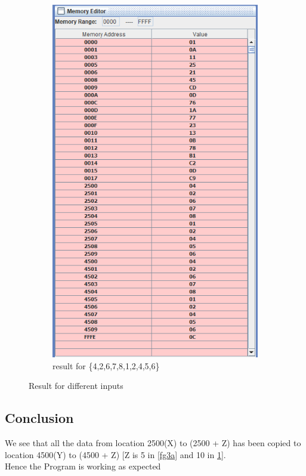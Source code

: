 \documentclass[a4paper]{article} %
\begin{document}
\begin{figure}[h!]
    \begin{subfigure}[b]{0.49\linewidth}
        \centering
        \includegraphics[width=\linewidth]{Assignment 2/1_Move Blocks/10 data copy.png}
        \caption{result for \{4,2,6,7,8,1,2,4,5,6\}}
        \label{fg3b}
    \end{subfigure}
    \caption{Result for different inputs}
    \label{fg3}
\end{figure}
\subsection{Conclusion}
We see that all the data from location 2500(X) to (2500 + Z) has been copied to location 4500(Y) to (4500 + Z) [Z is 5 in \ref{fg3a} and 10 in \ref{fg3b}].\\
Hence the Program is working as expected
\newpage
\end{document}
